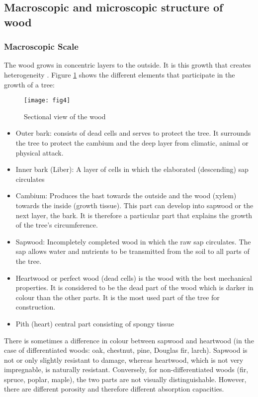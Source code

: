 \newpage

\subsection{Macroscopic and microscopic structure of wood}

\subsubsection{Macroscopic Scale}

The wood grows in concentric layers to the outside. It is this growth that creates heterogeneity \cite{Seddik2006phd}. Figure \ref{fig:fig4} shows the different elements that participate in the growth of a tree:


\begin{figure}[htp]
	\centering
	\texttt{[image: fig4]}
	\caption{Sectional view of the wood}
	\label{fig:fig4}
\end{figure}

\begin{itemize}
	\item Outer bark: consists of dead cells and serves to protect the tree. It surrounds the tree to protect the cambium and the deep layer from climatic, animal or physical attack. 
	\item Inner bark (Liber): A layer of cells in which the elaborated (descending) sap circulates
	\item Cambium: Produces the bast towards the outside and the wood (xylem) towards the inside (growth tissue). This part can develop into sapwood or the next layer, the bark. It is therefore a particular part that explains the growth of the tree's circumference.
	\item Sapwood: Incompletely completed wood in which the raw sap circulates. The sap allows water and nutrients to be transmitted from the soil to all parts of the tree.
	\item Heartwood or perfect wood (dead cells) is the wood with the best mechanical properties. It is considered to be the dead part of the wood which is darker in colour than the other parts. It is the most used part of the tree for construction.
	\item Pith (heart) central part consisting of spongy tissue
\end{itemize}

There is sometimes a difference in colour between sapwood and heartwood (in the case of differentiated woods: oak, chestnut, pine, Douglas fir, larch). Sapwood is not or only slightly resistant to damage, whereas heartwood, which is not very impregnable, is naturally resistant. Conversely, for non-differentiated woods (fir, spruce, poplar, maple), the two parts are not visually distinguishable. However, there are different porosity and therefore different absorption capacities.

